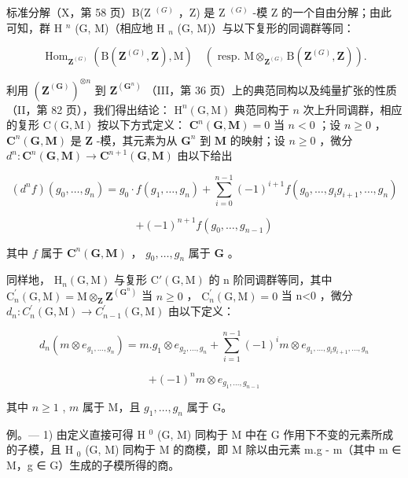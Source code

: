 标准分解（X，第 58 页）B(Z \(^{(G)}\) ，Z) 是 Z \(^{(G)}\) -模 Z 的一个自由分解；由此可知，群 H \(^{n}\) (G, M)（相应地 H \(_{n}\) (G, M)）与以下复形的同调群等同：

\[
\operatorname{Hom} _ {\mathbf {Z} ^ {(G)}} \left(\mathrm{B} (\mathbf {Z} ^ {(G)}, \mathbf {Z}), \mathrm{M}\right) \quad \left(\text { resp. } \mathrm{M} \otimes_ {\mathbf {Z} ^ {(G)}} \mathrm{B} (\mathbf {Z} ^ {(G)}, \mathbf {Z})\right).
\]

利用 \((\mathbf{Z}^{(\mathbf{G})})^{\otimes n}\) 到 \(\mathbf{Z}^{(\mathbf{G}^{n})}\) （III，第 36 页）上的典范同构以及纯量扩张的性质（II，第 82 页），我们得出结论： \(\mathrm{H}^n (\mathrm{G},\mathrm{M})\) 典范同构于 \(n\) 次上升同调群，相应的复形 \(\mathrm{C(G,M)}\) 按以下方式定义： \(\mathbf{C}^n (\mathbf{G},\mathbf{M}) = 0\) 当 \(n < 0\) ；设 \(n\geqslant 0\) ， \(\mathbf{C}^n (\mathbf{G},\mathbf{M})\) 是 \(\mathbf{Z}\) -模，其元素为从 \(\mathbf{G}^n\) 到 \(\mathbf{M}\) 的映射；设 \(n\geqslant 0\) ，微分 \(d^n:\mathbf{C}^n (\mathbf{G},\mathbf{M})\to \mathbf{C}^{n + 1}(\mathbf{G},\mathbf{M})\) 由以下给出

\[
(d ^ {n} f) (g _ {0}, \dots , g _ {n}) = g _ {0} \cdot f (g _ {1}, \dots , g _ {n}) + \sum_ {i = 0} ^ {n - 1} (- 1) ^ {i + 1} f (g _ {0}, \dots , g _ {i} g _ {i + 1}, \dots , g _ {n})
\]

\[
+ (- 1) ^ {n + 1} f \left(g _ {0}, \dots , g _ {n - 1}\right)
\]

其中 \(f\) 属于 \(\mathbf{C}^{n}(\mathbf{G},\mathbf{M})\) ， \(g_{0},\ldots,g_{n}\) 属于 \(\mathbf{G}\) 。

同样地， \(\mathrm{H}_{n}(\mathrm{G},\mathrm{M})\) 与复形 \(\mathrm{C}'(\mathrm{G},\mathrm{M})\) 的 n 阶同调群等同，其中 \(\mathrm{C}_{n}^{\prime}(\mathrm{G},\mathrm{M})=\mathrm{M}\otimes_{\mathbf{Z}}\mathbf{Z}^{(\mathbf{G}^{n})}\) 当 \(n\geqslant0\) ， \(\mathrm{C}_{n}^{\prime}(\mathrm{G},\mathrm{M})=0\) 当 n\textless0 ，微分 \(d_{n}:C_{n}^{\prime}(\mathrm{G},\mathrm{M})\to C_{n-1}^{\prime}(\mathrm{G},\mathrm{M})\) 由以下定义：

\[
d _ {n} (m \otimes e _ {g _ {1}, \dots , g _ {n}}) = m. g _ {1} \otimes e _ {g _ {2}, \dots , g _ {n}} + \sum_ {i = 1} ^ {n - 1} (- 1) ^ {i} m \otimes e _ {g _ {1}, \dots , g _ {i} g _ {i + 1}, \dots , g _ {n}}
\]

\[
+ (- 1) ^ {n} m \otimes e _ {g _ {1}, \dots , g _ {n - 1}}
\]

其中 \(n \geqslant 1\) , \(m\) 属于 M，且 \(g_1, \ldots, g_n\) 属于 G。

例。--- 1) 由定义直接可得 H \(^{0}\) (G, M) 同构于 M 中在 G 作用下不变的元素所成的子模，且 H \(_{0}\) (G, M) 同构于 M 的商模，即 M 除以由元素 m.g - m（其中 m ∈ M，g ∈ G）生成的子模所得的商。


